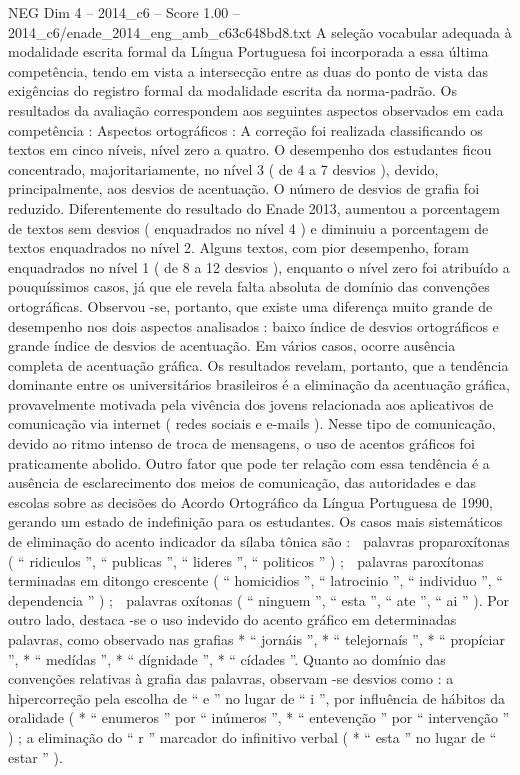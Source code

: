 \begin{textsample}{NEG Dim 4 – 2014\_c6 – Score 1.00 – 2014\_c6/enade\_2014\_eng\_amb\_c63c648bd8.txt}
A seleção vocabular adequada à modalidade escrita formal da Língua Portuguesa foi incorporada a essa última competência, tendo em vista a intersecção entre as duas do ponto de vista das exigências do registro formal da modalidade escrita da norma-padrão.
Os resultados da avaliação correspondem aos seguintes aspectos observados em cada competência : Aspectos ortográficos : A correção foi realizada classificando os textos em cinco níveis, nível zero a quatro.
O desempenho dos estudantes ficou concentrado, majoritariamente, no nível 3 ( de 4 a 7 desvios ), devido, principalmente, aos desvios de acentuação.
O número de desvios de grafia foi reduzido.
Diferentemente do resultado do Enade 2013, aumentou a porcentagem de textos sem desvios ( enquadrados no nível 4 ) e diminuiu a porcentagem de textos enquadrados no nível 2.
Alguns textos, com pior desempenho, foram enquadrados no nível 1 ( de 8 a 12 desvios ), enquanto o nível zero foi atribuído a pouquíssimos casos, já que ele revela falta absoluta de domínio das convenções ortográficas.
Observou -se, portanto, que existe uma diferença muito grande de desempenho nos dois aspectos analisados : baixo índice de desvios ortográficos e grande índice de desvios de acentuação.
Em vários casos, ocorre ausência completa de acentuação gráfica.
Os resultados revelam, portanto, que a tendência dominante entre os universitários brasileiros é a eliminação da acentuação gráfica, provavelmente motivada pela vivência dos jovens relacionada aos aplicativos de comunicação via internet ( redes sociais e e-mails ).
Nesse tipo de comunicação, devido ao ritmo intenso de troca de mensagens, o uso de acentos gráficos foi praticamente abolido.
Outro fator que pode ter relação com essa tendência é a ausência de esclarecimento dos meios de comunicação, das autoridades e das escolas sobre as decisões do Acordo Ortográfico da Língua Portuguesa de 1990, gerando um estado de indefinição para os estudantes.
Os casos mais sistemáticos de eliminação do acento indicador da sílaba tônica são :  palavras proparoxítonas ( “ ridiculos ”, “ publicas ”, “ lideres ”, “ politicos ” ) ;  palavras paroxítonas terminadas em ditongo crescente ( “ homicidios ”, “ latrocinio ”, “ individuo ”, “ dependencia ” ) ;  palavras oxítonas ( “ ninguem ”, “ esta ”, “ ate ”, “ ai ” ).
Por outro lado, destaca -se o uso indevido do acento gráfico em determinadas palavras, como observado nas grafias * “ jornáis ”, * “ telejornaís ”, * “ propíciar ”, * “ medídas ”, * “ dígnidade ”, * “ cídades ”.
Quanto ao domínio das convenções relativas à grafia das palavras, observam -se desvios como : a hipercorreção pela escolha de “ e ” no lugar de “ i ”, por influência de hábitos da oralidade ( * “ enumeros ” por “ inúmeros ”, * “ entevenção ” por “ intervenção ” ) ; a eliminação do “ r ” marcador do infinitivo verbal ( * “ esta ” no lugar de “ estar ” ).

\end{textsample}
